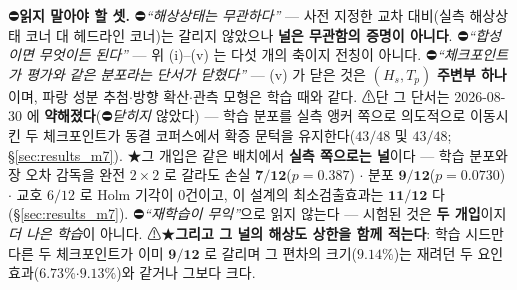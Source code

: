 \documentclass[11pt]{report}
\numberwithin{equation}{chapter}
\numberwithin{figure}{chapter}
\numberwithin{table}{chapter}
\begin{document}
⛔\textbf{읽지 말아야 할 셋.}
⛔\emph{``해상상태는 무관하다''} --- 사전 지정한 교차 대비(실측 해상상태 코너 대 헤드라인
코너)는 갈리지 않았으나 \textbf{널은 무관함의 증명이 아니다}.
⛔\emph{``합성이면 무엇이든 된다''} --- 위 (i)--(v) 는 다섯 개의 축이지 전칭이 아니다.
⛔\emph{``체크포인트가 평가와 같은 분포라는 단서가 닫혔다''} --- (v) 가 닫은 것은
$(H_s, T_p)$ \textbf{주변부 하나}이며, 파랑 성분 추첨$\cdot$방향 확산$\cdot$관측 모형은
학습 때와 같다.
⚠단 그 단서는 2026-08-30 에 \textbf{약해졌다}(⛔\emph{닫히지} 않았다) --- 학습 분포를
실측 앵커 쪽으로 의도적으로 이동시킨 두 체크포인트가 동결 코퍼스에서 확증 문턱을
유지한다($43/48$ 및 $43/48$; \S\ref{sec:results_m7}).
★그 개입은 같은 배치에서 \textbf{실측 쪽으로는 널}이다 --- 학습 분포와 장 오차 감독을 완전
$2\times2$ 로 갈라도 손실 $\mathbf{7/12}$($p = 0.387$) $\cdot$ 분포
$\mathbf{9/12}$($p = \mathbf{0.0730}$) $\cdot$ 교호 $6/12$ 로 Holm 기각이 $0$건이고,
이 설계의 최소검출효과는 $\mathbf{11/12}$ 다(\S\ref{sec:results_m7}).
⛔\emph{``재학습이 무익''}으로 읽지 않는다 --- 시험된 것은 \textbf{두 개입}이지 \emph{더 나은
학습}이 아니다. ⚠★\textbf{그리고 그 널의 해상도 상한을 함께 적는다}: 학습 시드만 다른 두
체크포인트가 이미 $\mathbf{9/12}$ 로 갈리며 그 편차의 크기($\mathbf{9.14\%}$)는 재려던 두
요인 효과($6.73\%$$\cdot$$9.13\%$)와 같거나 그보다 크다.
\end{document}
